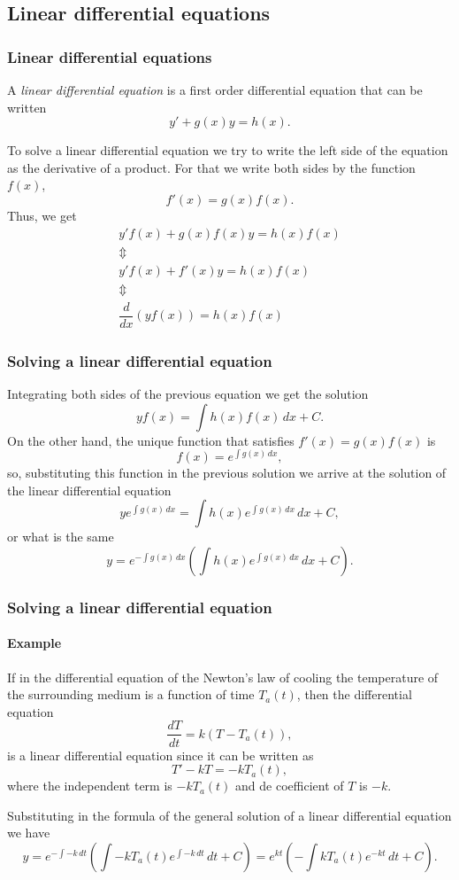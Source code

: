 \subsection{Linear differential equations}
\begin{frame}
\frametitle{Linear differential equations}
\begin{definition}
A \emph{linear differential equation} is a first order differential equation that can be written
\[y'+g(x)y = h(x).\]
\end{definition}

To solve a linear differential equation we try to write the left side of the equation as the derivative of a product. 
For that we write both sides by the function $f(x)$,
\[f'(x)=g(x)f(x).\]
Thus, we get
\[
\begin{array}{c}
y'f(x)+g(x)f(x)y=h(x)f(x)\\
\Updownarrow\\
y'f(x)+f'(x)y=h(x)f(x)\\
\Updownarrow\\
\dfrac{d}{dx}(yf(x))=h(x)f(x)
\end{array}
\]
\end{frame}


\begin{frame}
\frametitle{Solving a linear differential equation}
Integrating both sides of the previous equation we get the solution
\[
yf(x)=\int h(x)f(x)\,dx+C.
\]
On the other hand, the unique function that satisfies $f'(x)=g(x)f(x)$ is
\[
f(x)=e^{\int g(x)\,dx},
\]
so, substituting this function in the previous solution we arrive at the solution of the linear differential equation
\[
ye^{\int g(x)\,dx}=\int h(x) e^{\int g(x)\,dx}\,dx+C,
\]
or what is the same
\[
y=e^{-\int g(x)\,dx}\left(\int h(x)e^{\int g(x)\,dx}\,dx+C\right).
\]
\end{frame}


\begin{frame}
\frametitle{Solving a linear differential equation}
\framesubtitle{Example}
If in the differential equation of the Newton's law of cooling the temperature of the surrounding medium is a function of time $T_a(t)$, then the differential equation 
\[
\frac{dT}{dt}=k(T-T_a(t)),
\]
is a linear differential equation since it can be written as
\[
T'-kT=-kT_a(t),
\]
where the independent term is $-kT_a(t)$ and de coefficient of $T$ is $-k$.

Substituting in the formula of the general solution of a linear differential equation we have
\[
y=e^{-\int -k\,dt}\left(\int -kT_a(t)e^{\int -k\,dt}\,dt+C\right)=
e^{kt}\left(-\int kT_a(t)e^{-kt}\,dt+C\right).
\]
\end{frame}


